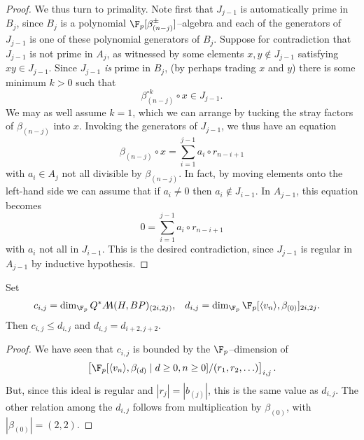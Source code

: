 \begin{proof}
We thus turn to primality.  Note first that \(J_{j-1}\) is automatically prime in \(B_j\), since \(B_j\) is a polynomial \(\F_p[\beta_{(n-j)}^\pm]\)--algebra and each of the generators of \(J_{j-1}\) is one of these polynomial generators of \(B_j\).  Suppose for contradiction that \(J_{j-1}\) is not prime in \(A_j\), as witnessed by some elements \(x, y \not\in J_{j-1}\) satisfying \(xy \in J_{j-1}\).  Since \(J_{j-1}\) \emph{is} prime in \(B_j\), (by perhaps trading \(x\) and \(y\)) there is some minimum \(k > 0\) such that \[\beta_{(n-j)}^{\circ k} \circ x \in J_{j-1}.\]  We may as well assume \(k = 1\), which we can arrange by tucking the stray factors of \(\beta_{(n-j)}\) into \(x\).  Invoking the generators of \(J_{j-1}\), we thus have an equation \[\beta_{(n-j)} \circ x = \sum_{i = 1}^{j-1} a_i \circ r_{n-i+1}\] with \(a_i \in A_j\) not all divisible by \(\beta_{(n-j)}\).  In fact, by moving elements onto the left-hand side we can assume that if \(a_i \ne 0\) then \(a_i \not\in J_{i-1}\).  In \(A_{j-1}\), this equation becomes \[0 = \sum_{i=1}^{j-1} a_i \circ r_{n-i+1}\] with \(a_i\) not all in \(J_{i-1}\).  This is the desired contradiction, since \(J_{j-1}\) is regular in \(A_{j-1}\) by inductive hypothesis.
\end{proof}

\begin{corollary}
Set
\begin{align*}
c_{i,j} & = \dim_{\F_p} Q^* \AA(H, BP)_{(2i, 2j)}, &
d_{i,j} & = \dim_{\F_p} \F_p[\<v_n\>, \beta_{(0)}]_{2i,2j}.
\end{align*}
Then \(c_{i,j} \le d_{i,j}\) and \(d_{i,j} = d_{i+2,j+2}\).
\end{corollary}
\begin{proof}
We have seen that \(c_{i,j}\) is bounded by the \(\F_p\)--dimension of \[\left[\F_p[\<v_n\>, \beta_{(d)} \mid d \ge 0, n \ge 0] / (r_1, r_2, \ldots)\right]_{i,j}.\]  But, since this ideal is regular and \(|r_j| = |b_{(j)}|\), this is the same value as \(d_{i,j}\).  The other relation among the \(d_{i,j}\) follows from multiplication by \(\beta_{(0)}\), with \(|\beta_{(0)}| = (2, 2)\).
\end{proof}

